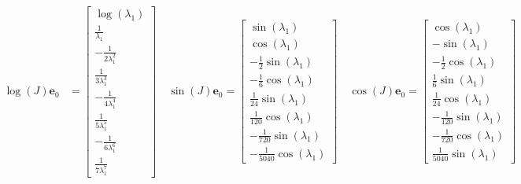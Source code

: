 \begin{displaymath}
\begin{split}
\log{\left (J \right )} \boldsymbol{e}_{0} &= \left[\begin{matrix}\log{\left (\lambda_{1} \right )}\\\frac{1}{\lambda_{1}}\\- \frac{1}{2 \lambda_{1}^{2}}\\\frac{1}{3 \lambda_{1}^{3}}\\- \frac{1}{4 \lambda_{1}^{4}}\\\frac{1}{5 \lambda_{1}^{5}}\\- \frac{1}{6 \lambda_{1}^{6}}\\\frac{1}{7 \lambda_{1}^{7}}\end{matrix}\right] \quad
\sin{\left (J \right )} \boldsymbol{e}_{0} = \left[\begin{matrix}\sin{\left (\lambda_{1} \right )}\\\cos{\left (\lambda_{1} \right )}\\- \frac{1}{2} \sin{\left (\lambda_{1} \right )}\\- \frac{1}{6} \cos{\left (\lambda_{1} \right )}\\\frac{1}{24} \sin{\left (\lambda_{1} \right )}\\\frac{1}{120} \cos{\left (\lambda_{1} \right )}\\- \frac{1}{720} \sin{\left (\lambda_{1} \right )}\\- \frac{1}{5040} \cos{\left (\lambda_{1} \right )}\end{matrix}\right] \quad
\cos{\left (J \right )} \boldsymbol{e}_{0} = \left[\begin{matrix}\cos{\left (\lambda_{1} \right )}\\- \sin{\left (\lambda_{1} \right )}\\- \frac{1}{2} \cos{\left (\lambda_{1} \right )}\\\frac{1}{6} \sin{\left (\lambda_{1} \right )}\\\frac{1}{24} \cos{\left (\lambda_{1} \right )}\\- \frac{1}{120} \sin{\left (\lambda_{1} \right )}\\- \frac{1}{720} \cos{\left (\lambda_{1} \right )}\\\frac{1}{5040} \sin{\left (\lambda_{1} \right )}\end{matrix}\right] \quad
\end{split}
\end{displaymath}

